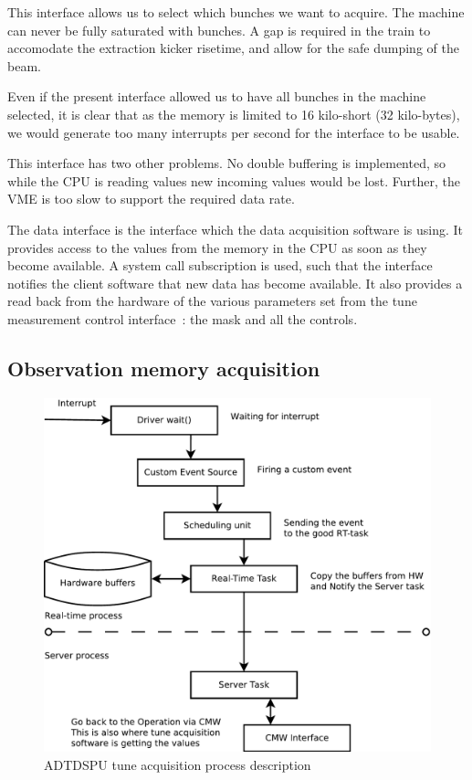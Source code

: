This interface allows us to select which bunches we want to acquire. The machine can never be fully saturated with bunches. A gap is required in the train to accomodate the extraction kicker risetime, and allow for the safe dumping of the beam.

Even if the present interface allowed us to have all bunches in the machine selected, it is clear that as the memory is limited to 16 kilo-short (32 kilo-bytes), we would generate too many interrupts per second for the interface to be usable.

This interface has two other problems. No double buffering is implemented, so while the \gls{CPU} is reading values new incoming values would be lost. Further, the \gls{VME} is too slow to support the required data rate.

The data interface is the interface which the data acquisition software is using. It provides access to the values from the memory in the \gls{CPU} as soon as they become available. A system call subscription is used, such that the interface notifies the client software that new data has become available. It also provides a read back from the hardware of the various parameters set from the tune measurement control interface~: the mask and all the controls.

\subsection{Observation memory acquisition}
\label{sec:obs_mem_acq}

\begin{figure}[H]
\caption{ADTDSPU tune acquisition process description}
\centering
\includegraphics[scale=0.5]{adtdspu_acq.pdf}
\end{figure}

